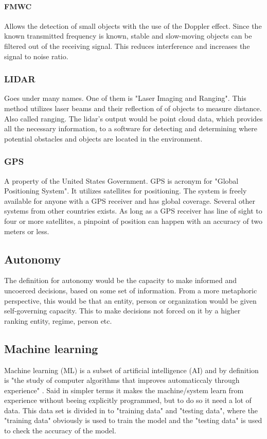\documentclass[conference]{IEEEtran}
\begin{document}
		 \paragraph{FMWC}
		 Allows the detection of small objects with the use of the Doppler effect. Since the
		 known transmitted frequency is known, stable and slow-moving objects can be filtered
		 out of the receiving signal. This reduces interference and increases the signal to noise
		 ratio.
	 \subsubsection{LIDAR}
		 Goes under many names. One of them is "Laser Imaging and Ranging".
		 This method utilizes laser beams and their reflection of of objects to measure distance.
		 Also called ranging. The lidar's output would be point cloud data, which provides all the
		 necessary information, to a software for detecting and determining where potential
		 obstacles and objects are located in the environment.\cite{Wiki:LIDAR}
	 \subsubsection{GPS}
		 A property of the United States Government. GPS is acronym for "Global Positioning System".
		 It utilizes satellites for positioning. The system is freely available for anyone with a GPS
		 receiver and has global coverage. Several other systems from other countries exists.
		 As long as a GPS receiver has line of sight to four or more satellites, a pinpoint of
		 position can happen with an accuracy of two meters or less.

 \subsection{Autonomy}
	 The definition for autonomy would be the capacity to make informed and uncoerced decisions,
	 based on some set of information. From a more metaphoric perspective, this would be that
	 an entity, person or organization would be given self-governing capacity. This to make
	 decisions not forced on it by a higher ranking entity, regime, person etc.

 \subsection{Machine learning}
	 Machine learning (ML) is a subset of artificial intelligence (AI) and by definition is "the study of
	 computer algorithms that improves automaticcaly through experience" \cite{Wiki:ML}.
	 Said in simpler terms it makes the machine/system learn from experience without beeing explicitly
	 programmed, but to do so it need a lot of data. This data set is divided in to "training data" and
	 "testing data", where the "training data" obviously is used to train the model and the "testing data"
	 is used to check the accuracy of the model.
\end{document}
